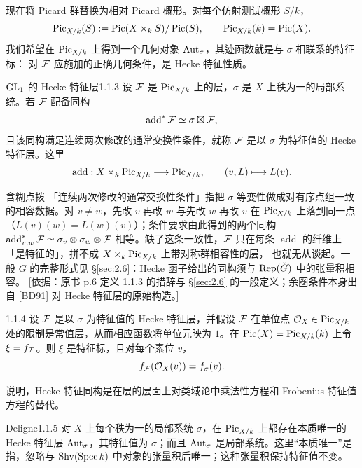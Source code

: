 现在将 Picard 群替换为相对 Picard 概形。对每个仿射测试概形 $S/k$，
\[
\operatorname{Pic}_{X/k}(S):=\operatorname{Pic}(X\times_k S)/\operatorname{Pic}(S),\qquad
\operatorname{Pic}_{X/k}(k)=\operatorname{Pic}(X).
\]
我们希望在 $\operatorname{Pic}_{X/k}$ 上得到一个几何对象 $\operatorname{Aut}_\sigma$，其迹函数就是与 $\sigma$ 相联系的特征标：
对 $\mathcal{F}$ 应施加的正确几何条件，是 Hecke 特征性质。

\begin{definition}{$\operatorname{GL}_1$ 的 Hecke 特征层}{1.1.3}
设 $\mathcal{F}$ 是 $\operatorname{Pic}_{X/k}$ 上的层，$\sigma$ 是 $X$ 上秩为一的局部系统。若 $\mathcal{F}$ 配备同构
\[\operatorname{add}^*\mathcal{F}\simeq\sigma\boxtimes\mathcal{F},\]
且该同构满足连续两次修改的通常交换性条件，就称 $\mathcal{F}$ 是以 $\sigma$ 为特征值的 Hecke 特征层。这里
\[
\operatorname{add}:X\times_k\operatorname{Pic}_{X/k}\longrightarrow\operatorname{Pic}_{X/k},
\qquad(v,L)\longmapsto L(v).
\]
\end{definition}

\begin{transnote}{含糊点拨}
「连续两次修改的通常交换性条件」指把 $\sigma$-等变性做成对有序点组一致的相容数据。对 $v\ne w$，先改 $v$ 再改 $w$ 与先改 $w$ 再改 $v$ 在 $\operatorname{Pic}_{X/k}$ 上落到同一点（$L(v)(w)=L(w)(v)$）；条件要求由此得到的两个同构 $\operatorname{add}^*_{v,w}\mathcal{F}\simeq\sigma_v\otimes\sigma_w\otimes\mathcal{F}$ 相等。缺了这条一致性，$\mathcal{F}$ 只在每条 $\operatorname{add}$ 的纤维上「是特征的」，拼不成 $X\times_k\operatorname{Pic}_{X/k}$ 上带对称群相容性的层， 也就无从谈起。一般 $G$ 的完整形式见 \S\ref{sec:2.6}：Hecke 函子给出的同构须与 $\operatorname{Rep}(\check{G})$ 中的张量积相容。
[依据：原书 p.6 定义 1.1.3 的措辞与 \S\ref{sec:2.6} 的一般定义；余圈条件本身出自 [BD91] 对 Hecke 特征层的原始构造。]
\end{transnote}

\begin{lemma}{}{1.1.4}
设 $\mathcal{F}$ 是以 $\sigma$ 为特征值的 Hecke 特征层，并假设 $\mathcal{F}$ 在单位点 $\mathcal{O}_X\in\operatorname{Pic}_{X/k}$ 处的限制是常值层，从而相应函数将单位元映为 $1$。在 $\operatorname{Pic}(X)=\operatorname{Pic}_{X/k}(k)$ 上令 $\xi=f_{\mathcal{F}}$。则 $\xi$ 是特征标，且对每个素位 $v$，
\[f_{\mathcal{F}}(\mathcal{O}_X(v))=f_\sigma(v).\]
\end{lemma}
说明，Hecke 特征同构是在层的层面上对类域论中乘法性方程和 Frobenius 特征值方程的替代。

\begin{theorem}{Deligne}{1.1.5}
对 $X$ 上每个秩为一的局部系统 $\sigma$，在 $\operatorname{Pic}_{X/k}$ 上都存在本质唯一的 Hecke 特征层 $\operatorname{Aut}_\sigma$，其特征值为 $\sigma$；而且 $\operatorname{Aut}_\sigma$ 是局部系统。这里“本质唯一”是指，忽略与 $\operatorname{Shv}(\operatorname{Spec} k)$ 中对象的张量积后唯一；这种张量积保持特征值不变。
\end{theorem}

